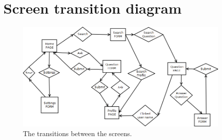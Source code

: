 \section{Screen transition diagram}\label{section:screen_transitions}


\begin{figure}
	\begin{center}
		\includegraphics[width=400px]{img/screen_transition_diagram}
	\end{center}
	\caption{The transitions between the screens.}
	\label{figure:screen_transition_diagram}
\end{figure}
